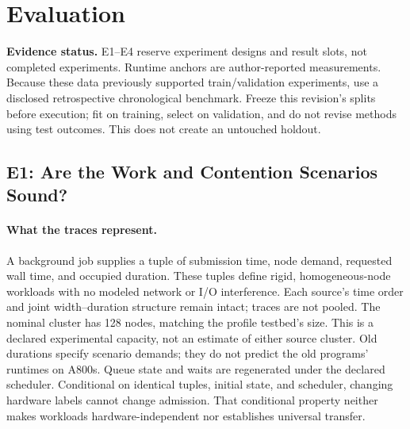 \section{Evaluation}
\label{sec:evaluation}

\noindent\textbf{Evidence status.} E1--E4 reserve experiment designs and result
slots, not completed experiments. Runtime anchors are author-reported measurements.
Because these data previously supported train/validation experiments, use a
disclosed retrospective chronological benchmark. Freeze this revision's splits
before execution; fit on training, select on validation, and do not revise methods
using test outcomes. This does not create an untouched holdout.

\subsection{E1: Are the Work and Contention Scenarios Sound?}

\paragraph{What the traces represent.}
A background job supplies a tuple of submission time, node demand, requested
wall time, and occupied duration. These tuples define rigid, homogeneous-node
workloads with no modeled network or I/O interference. Each source's time
order and joint width--duration structure remain intact; traces are not pooled.
The nominal cluster has 128 nodes, matching the profile testbed's size. This
is a declared experimental capacity, not an estimate of either source cluster.
Old durations specify scenario demands; they do not predict the old programs'
runtimes on A800s. Queue state and waits are regenerated under the declared
scheduler. Conditional on identical tuples, initial state, and scheduler,
changing hardware labels cannot change admission. That conditional property
neither makes workloads hardware-independent nor establishes universal transfer.

